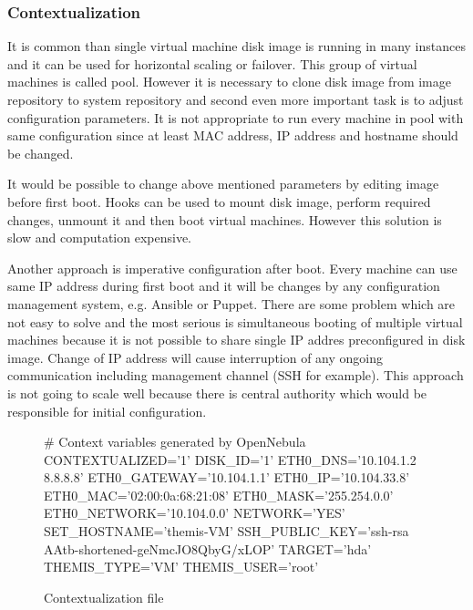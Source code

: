 \subsubsection{Contextualization}
It is common than single virtual machine disk image is running in many instances and it can be used for horizontal scaling or failover. This group of virtual machines is called pool. However it is necessary to clone disk image from image repository to system repository and second even more important task is to adjust configuration parameters. It is not appropriate to run every machine in pool with same configuration since at least \Ac{MAC} address, \Ac{IP} address and hostname should be changed.

It would be possible to change above mentioned parameters by editing image before first boot. Hooks can be used to mount disk image, perform required changes, unmount it and then boot virtual machines. However this solution is slow and computation expensive.

Another approach is imperative configuration after boot. Every machine can use same \Ac{IP} address during first boot and it will be changes by any configuration management system, e.g. Ansible or Puppet. There are some problem which are not easy to solve and the most serious is simultaneous booting of multiple virtual machines because it is not possible to share single \Ac{IP} addres preconfigured in disk image. Change of \Ac{IP} address will cause interruption of any ongoing communication including management channel (\Ac{SSH} for example). This approach is not going to scale well because there is central authority which would be responsible for initial configuration.






\begin{figure}[htb]
\caption{Contextualization file}
\label{code:template}
\begin{verbatimtab}
# Context variables generated by OpenNebula
CONTEXTUALIZED='1'
DISK_ID='1'
ETH0_DNS='10.104.1.2 8.8.8.8'
ETH0_GATEWAY='10.104.1.1'
ETH0_IP='10.104.33.8'
ETH0_MAC='02:00:0a:68:21:08'
ETH0_MASK='255.254.0.0'
ETH0_NETWORK='10.104.0.0'
NETWORK='YES'
SET_HOSTNAME='themis-VM'
SSH_PUBLIC_KEY='ssh-rsa AAtb-shortened-geNmcJO8QbyG/xLOP'
TARGET='hda'
THEMIS_TYPE='VM'
THEMIS_USER='root'
\end{verbatimtab}
\end{figure}

